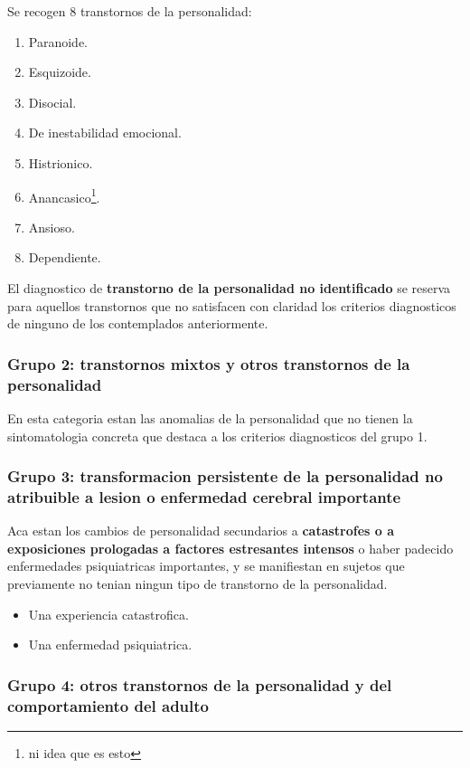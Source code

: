\documentclass[12pt,a4paper]{article}
\begin{document}
Se recogen 8 transtornos de la personalidad:

\begin{enumerate}
	\item Paranoide.
	\item Esquizoide.
	\item Disocial.
	\item De inestabilidad emocional.
	\item Histrionico.
	\item Anancasico\footnote{ni idea que es esto}.
	\item Ansioso.
	\item Dependiente.
\end{enumerate}

El diagnostico de \textbf{transtorno de la personalidad no identificado} se reserva para aquellos transtornos que no satisfacen con claridad los criterios diagnosticos de ninguno de los contemplados anteriormente. 

\subsubsection{Grupo 2: transtornos mixtos y otros transtornos de la personalidad}

En esta categoria estan las anomalias de la personalidad que no tienen la sintomatologia concreta que destaca a los criterios diagnosticos del grupo 1.  

\subsubsection{Grupo 3: transformacion persistente de la personalidad no atribuible a lesion o enfermedad cerebral importante}

Aca estan los cambios de personalidad secundarios a \textbf{catastrofes o a exposiciones prologadas a factores estresantes intensos} o haber padecido enfermedades psiquiatricas importantes, y se manifiestan en sujetos que previamente no tenian ningun tipo de transtorno de la personalidad. 

\begin{itemize}
	\item Una experiencia catastrofica.
	\item Una enfermedad psiquiatrica.
\end{itemize}

\subsubsection{Grupo 4: otros transtornos de la personalidad y del comportamiento del adulto}
\end{document}
